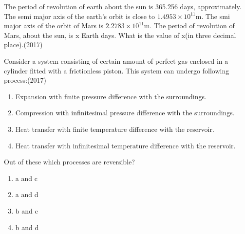 
\iffalse
\chapter{2017}
\author{AI24BTECH11008}
\section{ae}
\fi

    \item The period of revolution of earth about the sun is 365.256 days, approximately. The semi major axis of the earth's orbit is close to $1.4953\times 10^{11}$m. The smi major axis of the orbit of Mars is $2.2783\times 10^{11}$m. The period of revolution of Mars, about the sun, is x Earth days. What is the value of x(in three decimal place).\hfill (2017)
    \item Consider a system consisting of certain amount of perfect gas enclosed in a cylinder fitted with a frictionless piston. This system can undergo following process:\hfill (2017)
    \begin{enumerate}
        \item Expansion with finite pressure difference with the surroundings.
        \item Compression with infinitesimal pressure difference with the surroundings.
        \item Heat transfer with finite temperature difference with the reservoir.
        \item Heat transfer with infinitesimal temperature difference with the reservoir.
    \end{enumerate}
    Out of these which processes are reversible?
    \begin{enumerate}[label=(\Alph*)]
        \item a and c
        \item a and d 
        \item b and c 
        \item b and d 
    \end{enumerate}
    
